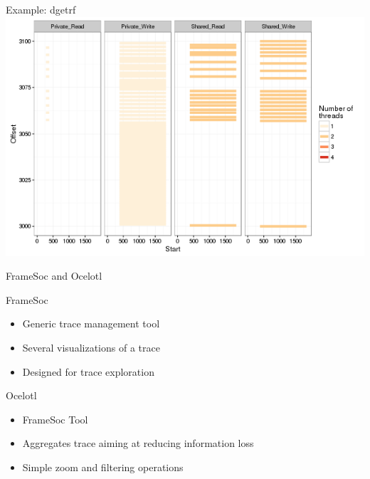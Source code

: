 \documentclass[xcolor={usenames,dvipsnames},hyperref={pdfusetitle}]{beamer}
\begin{document}
\begin{frame}{Example: dgetrf}
{{{            }{
                \includegraphics[width=\textwidth]{labbook-slides/intensity_Share_dgetrf_zoom-init1}
            }
        }
    }
    \pause
    \pause
    \pause
\end{frame}%

\begin{frame}{FrameSoc and Ocelotl}
    \begin{block}{FrameSoc~\cite{Pagano14frameSoC}}
        \begin{itemize}
            \item Generic trace management tool
            \item Several visualizations of a trace
            \item Designed for trace exploration
        \end{itemize}
    \end{block}
    \pause
    \begin{alertblock}{Ocelotl~\cite{Dosimont14Ocelotl}}
        \begin{itemize}
            \item FrameSoc Tool
            \item Aggregates trace aiming at reducing information loss
            \item Simple zoom and filtering operations
        \end{itemize}
    \end{alertblock}
\end{frame}
\end{document}
